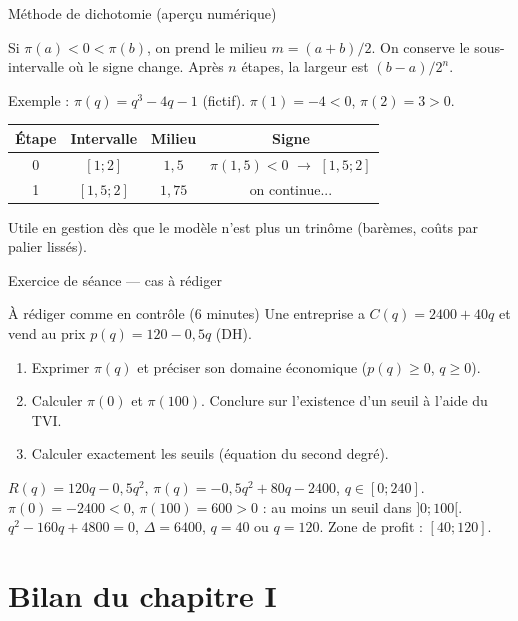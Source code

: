 \documentclass[10pt,aspectratio=169]{beamer}
\numberwithin{dummy}{section}
\newcommand{\CT}{C}
\newcommand{\Rec}{R}
\newcommand{\Prof}{\pi}
\begin{document}
\begin{frame}{Méthode de dichotomie (aperçu numérique)}
\begin{boxmethode}[Quand on ne sait pas résoudre $\Prof(q)=0$]
Si $\Prof(a)<0<\Prof(b)$, on prend le milieu $m=(a+b)/2$.
On conserve le sous-intervalle où le signe change.
Après $n$ étapes, la largeur est $(b-a)/2^n$.
\end{boxmethode}

{\small
Exemple : $\Prof(q)=q^3-4q-1$ (fictif). $\Prof(1)=-4<0$, $\Prof(2)=3>0$.
\begin{center}
\begin{tabular}{@{}cccc@{}}
\toprule
Étape & Intervalle & Milieu & Signe \\
\midrule
0 & $[1;2]$ & $1{,}5$ & $\Prof(1{,}5)<0$ $\to$ $[1{,}5;2]$ \\
1 & $[1{,}5;2]$ & $1{,}75$ & on continue... \\
\bottomrule
\end{tabular}
\end{center}
}
\vspace{0.2em}
Utile en gestion dès que le modèle n'est plus un trinôme (barèmes, coûts par palier lissés).
\end{frame}

\begin{frame}{Exercice de séance --- cas à rédiger}
\begin{alertblock}{À rédiger comme en contrôle (6 minutes)}
Une entreprise a $\CT(q)=2400+40q$ et vend au prix $p(q)=120-0{,}5q$ (DH).
\begin{enumerate}
    \item Exprimer $\Prof(q)$ et préciser son domaine économique ($p(q)\geqslant 0$, $q\geqslant 0$).
    \item Calculer $\Prof(0)$ et $\Prof(100)$. Conclure sur l'existence d'un seuil
    à l'aide du TVI.
    \item Calculer exactement les seuils (équation du second degré).
\end{enumerate}
\end{alertblock}

\pause
{\scriptsize
$\Rec(q)=120q-0{,}5q^2$, $\Prof(q)=-0{,}5q^2+80q-2400$, $q\in[0;240]$.
$\Prof(0)=-2400<0$, $\Prof(100)=600>0$ : au moins un seuil dans $]0;100[$.
$q^2-160q+4800=0$, $\Delta=6400$, $q=40$ ou $q=120$. Zone de profit : $[40;120]$.
}
\end{frame}

\section{Bilan du chapitre I}
\end{document}
